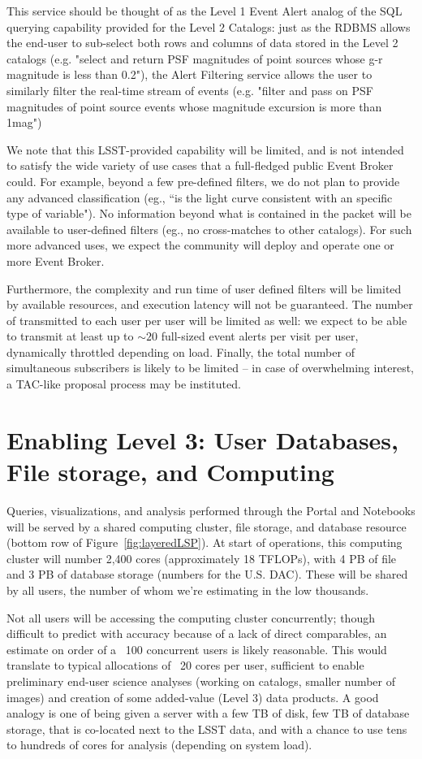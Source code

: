 \documentclass[DM,lsstdraft,toc]{lsstdoc}
\begin{document}
This service should be thought of as the Level 1 Event Alert analog of the SQL querying capability provided for the Level 2 Catalogs: just as the RDBMS allows the end-user to sub-select both rows and columns of data stored in the Level 2 catalogs (e.g. "select and return PSF magnitudes of point sources whose g-r magnitude is less than 0.2"), the Alert Filtering service allows the user to similarly filter the real-time stream of events (e.g. "filter and pass on PSF magnitudes of point source events whose magnitude excursion is more than 1mag")

We note that this LSST-provided capability will be limited, and is not intended to satisfy the wide variety of use cases that a full-fledged public Event Broker could. For example, beyond a few pre-defined filters, we do not plan to provide any advanced classification (eg., ``is the light curve consistent with an specific type of variable"). No information beyond what is contained in the \VOEvent packet will be available to user-defined filters (eg., no cross-matches to other catalogs). For such more advanced uses, we expect the community will deploy and operate one or more Event Broker.

Furthermore, the complexity and run time of user defined filters will be limited by available resources, and execution latency will not be guaranteed. The number of \VOEvents transmitted to each user per user will be limited as well: we expect to be able to transmit at least up to $\sim 20$ full-sized event alerts per visit per user, dynamically throttled depending on load. Finally, the total number of simultaneous subscribers is likely to be limited -- in case of overwhelming interest, a TAC-like proposal process may be instituted.

\section{Enabling Level 3: User Databases, File storage, and Computing}

Queries, visualizations, and analysis performed through the Portal and
Notebooks will be served by a shared computing cluster, file storage, and
database resource (bottom row of Figure~\ref{fig:layeredLSP}).  At start of operations,
this computing cluster will number 2,400 cores (approximately 18 TFLOPs),
with 4 PB of file and 3 PB of database storage (numbers for the U.S.  DAC). 
These will be shared by all users, the number of whom we’re estimating in
the low thousands.

Not all users will be accessing the computing cluster concurrently; though
difficult to predict with accuracy because of a lack of direct comparables,
an estimate on order of a ~100 concurrent users is likely reasonable.  This
would translate to typical allocations of ~20 cores per user, sufficient to
enable preliminary end-user science analyses (working on catalogs, smaller
number of images) and creation of some added-value (Level 3) data products. 
A good analogy is one of being given a server with a few TB of disk, few TB
of database storage, that is co-located next to the LSST data, and with a
chance to use tens to hundreds of cores for analysis (depending on system
load).
\end{document}
